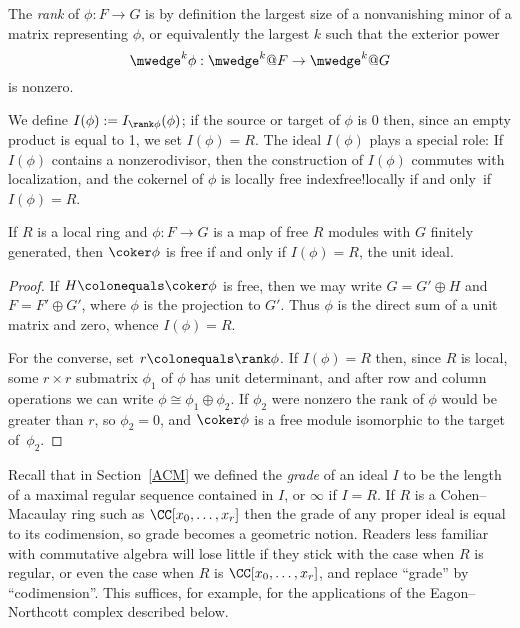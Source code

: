 The \emph{rank} of $\phi: F\to G$ is by definition the largest size of a nonvanishing
%
minor of a matrix representing $\phi$,
or equivalently the largest $k$ such that the
exterior power
%
$$\mwedge^{k}\phi : \mwedge^{k}@F \to \mwedge^{k}@G$$
is nonzero. 

We define
$I(\phi): = I_{\rank \phi}(\phi)$; if the source or target of $\phi$ is 0 then, since an empty
product is equal to 1,
we set $I(\phi) = R$.  The ideal $I(\phi)$ plays a special role: 
If $I(\phi)$ contains a 
nonzerodivisor,
%
then the construction of $I(\phi)$
commutes with localization, and the cokernel
of $\phi$
is  
locally free
index{free!locally}
 if and only~if $I(\phi) = R$. 

\begin{lemma}\label{free coker}
If $R$ is a local ring and $\phi: F\to G$ is a map of free $R$ modules
with $G$ finitely generated,
then $\coker \phi$ is free if and only if $I(\phi) = R$, the unit ideal.
\end{lemma}

\begin{proof}
 If $H \colonequals \coker \phi$ is free, then we may write
 $G = G'\oplus H$ and $F = F'\oplus G'$, where $\phi$ is the projection to $G'$.
 Thus $\phi$ is the direct sum of a unit matrix and zero, whence $I(\phi) = R$.
 
For the converse, set $r\colonequals \rank \phi$. If $I(\phi) = R$
then, 
since
$R$ is local, some $r \times r$ submatrix $\phi_{1}$ of
$\phi$ has unit determinant, and after row and column operations we
can write $\phi \cong \phi_{1}\oplus \phi_{2}$. If $\phi_{2}$
were nonzero
the rank of $\phi$ would be greater than $r$, so $\phi_{2} = 0$, and
$\coker \phi$ is a free module isomorphic to the target of~$\phi_{2}$.
\end{proof}

Recall that in Section~\ref{ACM} we defined
the \emph{grade} of an ideal $I$ to be the length of a maximal regular
%
sequence
contained in $I$, or $\infty$ if $I=R$. If $R$ is a
Cohen--Macaulay ring
%
such as
$\CC[x_{0},\dots, x_{r}]$ then the grade
of any proper ideal is equal to its codimension, so grade becomes a
geometric notion.
Readers less familiar with commutative algebra will lose little if they
stick with the case when $R$ is
regular, or even the case when $R$ is $\CC[x_{0},\dots, x_{r}]$,
and replace ``grade'' by ``codimension''. This
suffices, for example, for the applications
%
of the Eagon--Northcott complex described below.

